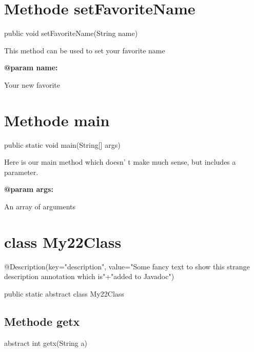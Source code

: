 \documentclass[12pt]{scrreprt}
\begin{document}
\section{Methode setFavoriteName}
\label{examples.SimpleExample:setFavoriteName}




public void setFavoriteName(String name)


This method can be used to set your favorite name



\textbf{@param name:}

\quad\quad Your new favorite



\section{Methode main}
\label{examples.SimpleExample:main}




public static void main(String[] args)


Here is our main method which doesn' t make much sense, but includes a parameter.



\textbf{@param args:}

\quad\quad An array of arguments



\section{class My22Class}
\label{examples.SimpleExample.My22Class}

@Description(key="description", value="Some fancy text to show this strange description annotation which is"+"added to Javadoc")



public static abstract class My22Class






\subsection{Methode getx}
\label{examples.SimpleExample.My22Class:getx}




 abstract int getx(String a)
\end{document}
